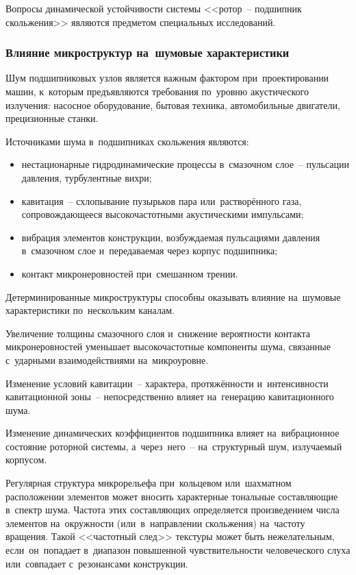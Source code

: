 Вопросы динамической устойчивости системы <<ротор~-- подшипник скольжения>> являются предметом специальных исследований.

\subsubsection{Влияние микроструктур на~шумовые характеристики}

Шум подшипниковых узлов является важным фактором при~проектировании машин, к~которым предъявляются требования по~уровню акустического излучения: насосное оборудование, бытовая техника, автомобильные двигатели, прецизионные станки.

Источниками шума в~подшипниках скольжения являются:
\begin{itemize}
\item нестационарные гидродинамические процессы в~смазочном слое~-- пульсации давления, турбулентные вихри;
\item кавитация~-- схлопывание пузырьков пара или~растворённого газа, сопровождающееся высокочастотными акустическими импульсами;
\item вибрация элементов конструкции, возбуждаемая пульсациями давления в~смазочном слое и~передаваемая через корпус подшипника;
\item контакт микронеровностей при~смешанном трении.
\end{itemize}

Детерминированные микроструктуры способны оказывать влияние на~шумовые характеристики по~нескольким каналам.

Увеличение толщины смазочного слоя и~снижение вероятности контакта микронеровностей уменьшает высокочастотные компоненты шума, связанные с~ударными взаимодействиями на~микроуровне.

Изменение условий кавитации~-- характера, протяжённости и~интенсивности кавитационной зоны~-- непосредственно влияет на~генерацию кавитационного шума.

Изменение динамических коэффициентов подшипника влияет на~вибрационное состояние роторной системы, а~через~него~-- на~структурный шум, излучаемый корпусом.

Регулярная структура микрорельефа при~кольцевом или~шахматном расположении элементов может вносить характерные тональные составляющие в~спектр шума. Частота этих составляющих определяется произведением числа элементов на~окружности (или~в~направлении скольжения) на~частоту вращения. Такой <<частотный след>> текстуры может быть нежелательным, если~он~попадает в~диапазон повышенной чувствительности человеческого слуха или~совпадает с~резонансами конструкции.

